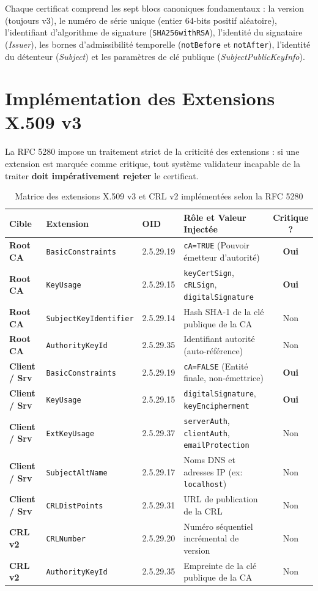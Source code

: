 \documentclass[12pt,a4paper]{report}
\begin{document}
Chaque certificat comprend les sept blocs canoniques fondamentaux : la version (toujours v3), le numéro de série unique (entier 64-bits positif aléatoire), l'identifiant d'algorithme de signature (\texttt{SHA256withRSA}), l'identité du signataire (\textit{Issuer}), les bornes d'admissibilité temporelle (\texttt{notBefore} et \texttt{notAfter}), l'identité du détenteur (\textit{Subject}) et les paramètres de clé publique (\textit{SubjectPublicKeyInfo}).

\section{Implémentation des Extensions X.509 v3}
La RFC 5280 impose un traitement strict de la criticité des extensions : si une extension est marquée comme critique, tout système validateur incapable de la traiter \textbf{doit impérativement rejeter} le certificat.

\begin{table}[H]
\centering
\small
\begin{tabularx}{\textwidth}{l l l X c}
\toprule
\textbf{Cible} & \textbf{Extension} & \textbf{OID} & \textbf{Rôle et Valeur Injectée} & \textbf{Critique ?} \\
\midrule
\textbf{Root CA} & \texttt{BasicConstraints} & 2.5.29.19 & \texttt{cA=TRUE} (Pouvoir émetteur d'autorité) & \textbf{Oui} \\
\textbf{Root CA} & \texttt{KeyUsage} & 2.5.29.15 & \texttt{keyCertSign}, \texttt{cRLSign}, \texttt{digitalSignature} & \textbf{Oui} \\
\textbf{Root CA} & \texttt{SubjectKeyIdentifier} & 2.5.29.14 & Hash SHA-1 de la clé publique de la CA & Non \\
\textbf{Root CA} & \texttt{AuthorityKeyId} & 2.5.29.35 & Identifiant autorité (auto-référence) & Non \\
\midrule
\textbf{Client / Srv} & \texttt{BasicConstraints} & 2.5.29.19 & \texttt{cA=FALSE} (Entité finale, non-émettrice) & \textbf{Oui} \\
\textbf{Client / Srv} & \texttt{KeyUsage} & 2.5.29.15 & \texttt{digitalSignature}, \texttt{keyEncipherment} & \textbf{Oui} \\
\textbf{Client / Srv} & \texttt{ExtKeyUsage} & 2.5.29.37 & \texttt{serverAuth}, \texttt{clientAuth}, \texttt{emailProtection} & Non \\
\textbf{Client / Srv} & \texttt{SubjectAltName} & 2.5.29.17 & Noms DNS et adresses IP (ex: \texttt{localhost}) & Non \\
\textbf{Client / Srv} & \texttt{CRLDistPoints} & 2.5.29.31 & URL de publication de la CRL & Non \\
\midrule
\textbf{CRL v2} & \texttt{CRLNumber} & 2.5.29.20 & Numéro séquentiel incrémental de version & Non \\
\textbf{CRL v2} & \texttt{AuthorityKeyId} & 2.5.29.35 & Empreinte de la clé publique de la CA & Non \\
\bottomrule
\end{tabularx}
\caption{Matrice des extensions X.509 v3 et CRL v2 implémentées selon la RFC 5280}
\label{tab:extensions_rfc5280}
\end{table}
\end{document}
